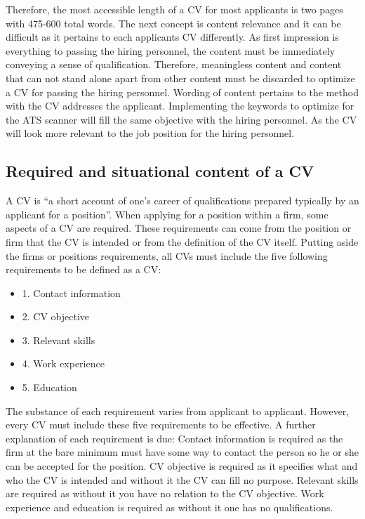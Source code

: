 Therefore, the most accessible length of a CV for most applicants is two pages with 475-600 total words.
The next concept is content relevance and it can be difficult as it pertains to each applicants CV differently.
As first impression is everything to passing the hiring personnel, the content must be immediately conveying a sense of qualification.
Therefore, meaningless content and content that can not stand alone apart from other content must be discarded to optimize a CV for passing the hiring personnel.
Wording of content pertains to the method with the CV addresses the applicant.
Implementing the keywords to optimize for the ATS scanner will fill the same objective with the hiring personnel.
As the CV will look more relevant to the job position for the hiring personnel.\\

\subsection{Required and situational content of a CV}
A CV is “a short account of one’s career of qualifications prepared typically by an applicant for a position”.\cite{Difference_between_resume_and_curriculum_Vitae}
When applying for a position within a firm, some aspects of a CV are required.
These requirements can come from the position or firm that the CV is intended or from the definition of the CV itself.
Putting aside the firms or positions requirements, all CVs must include the five following requirements to be defined as a CV:
\begin{itemize}
   \item 1. Contact information
   \item 2. CV objective
   \item 3. Relevant skills
   \item 4. Work experience
   \item 5. Education\cite{Write_a_curriculum_Vitae} \\
\end{itemize}
The substance of each requirement varies from applicant to applicant. However, every CV must include these five requirements to be effective.
A further explanation of each requirement is due:
Contact information is required as the firm at the bare minimum must have some way to contact the person so he or she can be accepted for the position.
CV objective is required as it specifies what and who the CV is intended and without it the CV can fill no purpose.
Relevant skills are required as without it you have no relation to the CV objective.
Work experience and education is required as without it one has no qualifications. \\

